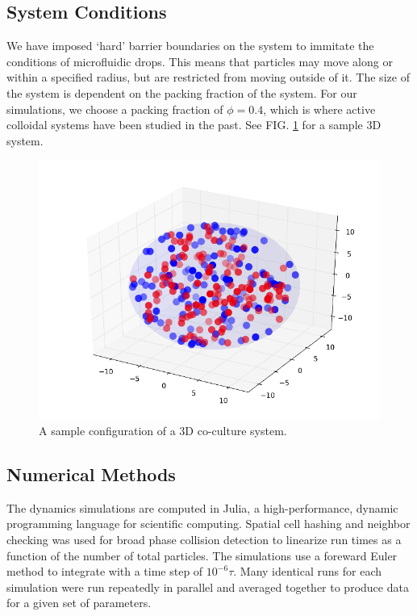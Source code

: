 \documentclass[aps,prb,twocolumn,groupedaddress,nofootinbib,floatfix]{revtex4}
\begin{document}

\subsection*{System Conditions}
We have imposed `hard' barrier boundaries on the system to immitate the conditions
of microfluidic drops. This means that particles may move along or within a
specified radius, but are restricted from moving outside of it. 
The size of the system is dependent on the packing fraction of the system. 
For our simulations, we choose a packing fraction of $\phi=0.4$, which is where 
active colloidal systems have been studied in the past\cite{RednerBaskaran}.
See FIG. \ref{fig:3dconf} for a sample 3D system.

\begin{figure}
  \includegraphics[width=1.0\columnwidth]{3dconf.png}
  \caption[3dconf]
    {A sample configuration of a 3D co-culture system.}
   \label{fig:3dconf}
\end{figure}

\subsection*{Numerical Methods}

The dynamics simulations are computed in Julia, a high-performance, dynamic 
programming language for scientific computing. Spatial cell hashing and neighbor 
checking was used for broad phase collision detection to linearize run times 
as a function of the number of total particles. The simulations use a foreward 
Euler method to integrate with a time step of $10^{-6}\tau$. 
Many identical runs for each  simulation were run repeatedly in parallel and 
averaged together to produce data for a given set of parameters.
\end{document}
